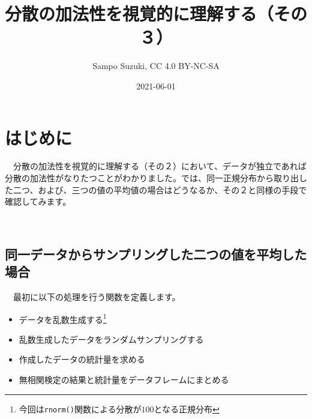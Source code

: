 \documentclass[a4paper]{tufte-handout}
\title[分散の加法性を視覚的に理解する（その３）]{分散の加法性を視覚的に理解する（その３）}
\author{Sampo Suzuki, CC 4.0 BY-NC-SA}
\date{2021-06-01}
\providecommand{\tightlist}{%
  \setlength{\itemsep}{0pt}\setlength{\parskip}{0pt}}
\begin{document}
\maketitle




\hypertarget{ux306fux3058ux3081ux306b}{%
\section{\texorpdfstring{\textbf{はじめに}}{はじめに}}\label{ux306fux3058ux3081ux306b}}

　分散の加法性を視覚的に理解する（その２）において、データが独立であれば分散の加法性がなりたつことがわかりました。では、同一正規分布から取り出した二つ、および、三つの値の平均値の場合はどうなるか、その２と同様の手段で確認してみます。

　

\hypertarget{ux540cux4e00ux30c7ux30fcux30bfux304bux3089ux30b5ux30f3ux30d7ux30eaux30f3ux30b0ux3057ux305fux4e8cux3064ux306eux5024ux3092ux5e73ux5747ux3057ux305fux5834ux5408}{%
\subsection{\texorpdfstring{\textbf{同一データからサンプリングした二つの値を平均した場合}}{同一データからサンプリングした二つの値を平均した場合}}\label{ux540cux4e00ux30c7ux30fcux30bfux304bux3089ux30b5ux30f3ux30d7ux30eaux30f3ux30b0ux3057ux305fux4e8cux3064ux306eux5024ux3092ux5e73ux5747ux3057ux305fux5834ux5408}}

　最初に以下の処理を行う関数を定義します。

\begin{itemize}
\tightlist
\item
  データを乱数生成する\footnote{今回は\texttt{rnorm()}関数による分散が\(100\)となる正規分布}
\item
  乱数生成したデータをランダムサンプリングする
\item
  作成したデータの統計量を求める
\item
  無相関検定の結果と統計量をデータフレームにまとめる
\end{itemize}
\end{document}
